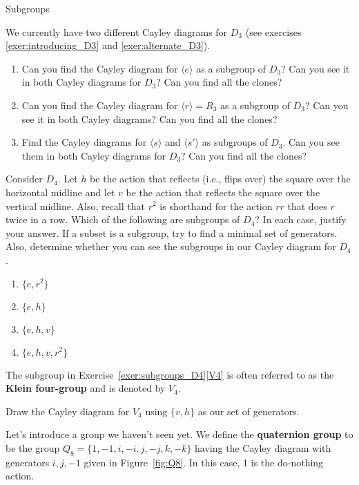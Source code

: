 \begin{section}{Subgroups}
\begin{exercise}
We currently have two different Cayley diagrams for $D_3$ (see exercises \ref{exer:introducing_D3} and \ref{exer:alternate_D3}).  
\begin{enumerate}[label=\rm{(\alph*)}]
\item Can you find the Cayley diagram for $\langle e\rangle$ as a subgroup of $D_3$?  Can you see it in both Cayley diagrams for $D_3$?  Can you find all the clones?
\item Can you find the Cayley diagram for $\langle r\rangle =R_3$ as a subgroup of $D_3$?  Can you see it in both Cayley diagrams?  Can you find all the clones?
\item Find the Cayley diagrams for $\langle s\rangle$ and $\langle s'\rangle$ as subgroups of $D_3$.  Can you see them in both Cayley diagrams for $D_3$?  Can you find all the clones?
\end{enumerate}
\end{exercise}

\begin{exercise}\label{exer:subgroups_D4}
Consider $D_4$.  Let $h$ be the action that reflects (i.e., flips over) the square over the horizontal midline and let $v$ be the action that reflects the square over the vertical midline.  Also, recall that $r^2$ is shorthand for the action $rr$ that does $r$ twice in a row.  Which of the following are subgroups of $D_4$?  In each case, justify your answer.  If a subset is a subgroup, try to find a minimal set of generators.  Also, determine whether you can see the subgroups in our Cayley diagram for $D_4$.
\begin{enumerate}[label=\rm{(\alph*)}]
\item $\{e, r^2\}$
\item $\{e,h\}$
\item $\{e, h, v\}$
\item\label{V4} $\{e, h, v, r^2\}$
\end{enumerate}
\end{exercise}

The subgroup in Exercise~\ref{exer:subgroups_D4}\ref{V4} is often referred to as the \textbf{Klein four-group} and is denoted by $V_4$.

\begin{exercise}\label{exer:V4}
Draw the Cayley diagram for $V_4$ using $\{v,h\}$ as our set of generators.
\end{exercise}

Let's introduce a group we haven't seen yet.  We define the \textbf{quaternion group} to be the group $Q_8=\{1,-1,i,-i,j,-j,k,-k\}$ having the Cayley diagram with generators $i, j, -1$ given in Figure~\ref{fig:Q8}.  In this case, 1 is the do-nothing action.


\end{section}
